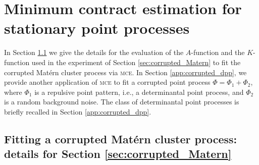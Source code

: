 \documentclass[11pt,a4paper,oneside]{article}
\theoremstyle{definition}
\theoremstyle{remark}
\begin{document}
\section{Minimum contract estimation for stationary point processes} \label{app:MCE}




In Section \ref{app:details_matern} we give the details for the evaluation of the $A$-function and the $K$-function used in the experiment of Section \ref{sec:corrupted_Matern} to fit the corrupted Mat\'ern cluster process via \textsc{mce}. In Section \ref{app:corrupted_dpp}, we provide another application of \textsc{mce} to fit a corrupted point process $\Phi=\Phi_1 + \Phi_2$, where $\Phi_1$ is a repulsive point pattern, i.e., a determinantal point process, and $\Phi_2$ is a random background noise. The class of determinantal point processes is briefly recalled in Section \ref{app:corrupted_dpp}.






\subsection{Fitting a corrupted Mat\'ern cluster process: details for Section \ref{sec:corrupted_Matern}}
\label{app:details_matern}
\end{document}
